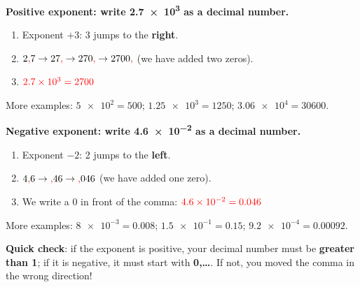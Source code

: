 \begin{example}
    \textbf{Positive exponent: write \num{2.7e3} as a decimal number.}
    \begin{enumerate}[label=\numberballmDarkTeal]
        \item Exponent \(+3\): 3 jumps to the \textbf{right}.
        \item \(2\textcolor{red}{\mathbf{,}} 7 \to 27\textcolor{red}{\mathbf{,}} \to 270\textcolor{red}{\mathbf{,}} \to 2700\textcolor{red}{\mathbf{,}}\) (we have added two zeros).
        \item \(\textcolor{red}{\num{2.7e3} = \num{2700}}\)
    \end{enumerate}
    More examples: \(\num{5e2} = 500\); \quad \(\num{1.25e3} = 1250\); \quad \(\num{3.06e4} = \num{30600}\).
\end{example}

\begin{example}
    \textbf{Negative exponent: write \num{4.6e-2} as a decimal number.}
    \begin{enumerate}[label=\numberballmDarkTeal]
        \item Exponent \(-2\): 2 jumps to the \textbf{left}.
        \item \(4\textcolor{red}{\mathbf{,}} 6 \to \textcolor{red}{\mathbf{,}} 46 \to \textcolor{red}{\mathbf{,}} 046\) (we have added one zero).
        \item We write a 0 in front of the comma: \(\textcolor{red}{\num{4.6e-2} = \num{0.046}}\)
    \end{enumerate}
    More examples: \(\num{8e-3} = \num{0.008}\); \quad \(\num{1.5e-1} = \num{0.15}\); \quad \(\num{9.2e-4} = \num{0.00092}\).
\end{example}

\begin{marker}
    \textbf{Quick check}: if the exponent is positive, your decimal number must be \textbf{greater than 1}; if it is negative, it must start with \textbf{0,\ldots}. If not, you moved the comma in the wrong direction!
\end{marker}

